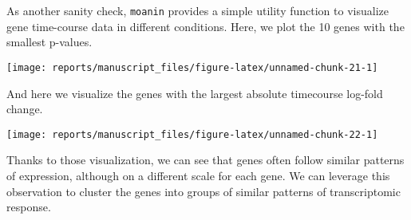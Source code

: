 \documentclass[9pt,a4paper,]{extarticle}
\newenvironment{Shaded}{\begin{snugshade}}{\end{snugshade}}
\newcommand{\DataTypeTok}[1]{\textcolor[rgb]{0.13,0.29,0.53}{#1}}
\newcommand{\DecValTok}[1]{\textcolor[rgb]{0.00,0.00,0.81}{#1}}
\newcommand{\FloatTok}[1]{\textcolor[rgb]{0.00,0.00,0.81}{#1}}
\newcommand{\KeywordTok}[1]{\textcolor[rgb]{0.13,0.29,0.53}{\textbf{#1}}}
\newcommand{\NormalTok}[1]{#1}
\newcommand{\OperatorTok}[1]{\textcolor[rgb]{0.81,0.36,0.00}{\textbf{#1}}}
\newcommand{\OtherTok}[1]{\textcolor[rgb]{0.56,0.35,0.01}{#1}}
\newcommand{\StringTok}[1]{\textcolor[rgb]{0.31,0.60,0.02}{#1}}
\begin{document}
As another sanity check, \texttt{moanin} provides a simple utility function to
visualize gene time-course data in different conditions. Here, we plot the 10
genes with the smallest p-values.

\begin{Shaded}
\end{Shaded}

\begin{center}\texttt{[image: reports/manuscript\_files/figure-latex/unnamed-chunk-21-1]} \end{center}

And here we visualize the genes with the largest absolute timecourse log-fold
change.

\begin{Shaded}
\end{Shaded}

\begin{center}\texttt{[image: reports/manuscript\_files/figure-latex/unnamed-chunk-22-1]} \end{center}

Thanks to those visualization, we can see that genes often follow similar
patterns of expression, although on a different scale for each gene. We can
leverage this observation to cluster the genes into groups of similar patterns
of transcriptomic response.
\end{document}
